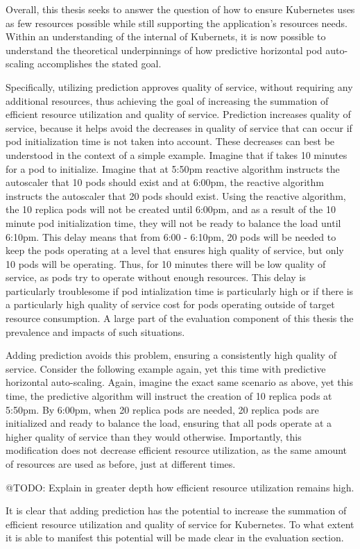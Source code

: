 Overall, this thesis seeks to answer the question of how to ensure Kubernetes
uses as few resources possible while still supporting the application's
resources needs. Within an understanding of the internal of Kubernets, it is now
possible to understand the theoretical underpinnings of how predictive
horizontal pod auto-scaling accomplishes the stated goal.

Specifically, utilizing prediction approves quality of service, without
requiring any additional resources, thus achieving the goal of increasing the
summation of efficient resource utilization and quality of service. Prediction
increases quality of service, because it helps avoid the decreases in quality of
service that can occur if pod initialization time is not taken into account.
These decreases can best be understood in the context of a simple example.
Imagine that if takes 10 minutes for a pod to initialize. Imagine that at 5:50pm
reactive algorithm instructs the autoscaler that 10 pods should exist and at
6:00pm, the reactive algorithm instructs the autoscaler that 20 pods should
exist. Using the reactive algorithm, the 10 replica pods will not be created
until 6:00pm, and as a result of the 10 minute pod initialization time, they
will not be ready to balance the load until 6:10pm. This delay means that from
6:00 - 6:10pm, 20 pods will be needed to keep the pods operating at a level that
ensures high quality of service, but only 10 pods will be operating. Thus, for
10 minutes there will be low quality of service, as pods try to operate without
enough resources. This delay is particularly troublesome if pod intialization
time is particularly high or if there is a particularly high quality of service
cost for pods operating outside of target resource consumption. A large part of
the evaluation component of this thesis the prevalence and impacts of such
situations.

Adding prediction avoids this problem, ensuring a consistently high quality of
service. Consider the following example again, yet this time with predictive
horizontal auto-scaling. Again, imagine the exact same scenario as above, yet
this time, the predictive algorithm will instruct the creation of 10 replica
pods at 5:50pm. By 6:00pm, when 20 replica pods are needed, 20 replica pods are
initialized and ready to balance the load, ensuring that all pods operate at a
higher quality of service than they would otherwise. Importantly, this
modification does not decrease efficient resource utilization, as the same
amount of resources are used as before, just at different times.

@TODO: Explain in greater depth how efficient resource utilization remains high.

It is clear that adding prediction has the potential to increase the summation
of efficient resource utilization and quality of service for Kubernetes. To what
extent it is able to manifest this potential will be made clear in the
evaluation section.
